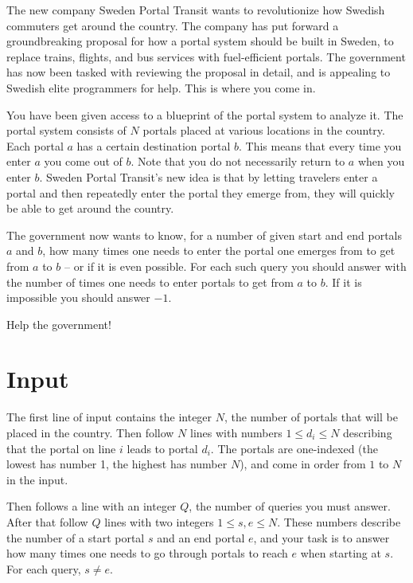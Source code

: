 
The new company Sweden Portal Transit wants to revolutionize how Swedish
commuters get around the country. The company has put forward
a groundbreaking proposal for how a portal system should be built in Sweden, to
replace trains, flights, and bus services with fuel-efficient portals. The government
has now been tasked with reviewing the proposal in detail, and is appealing to
Swedish elite programmers for help. This is where you come in.

You have been given access to a blueprint of the portal system to analyze it.
The portal system consists of $N$ portals placed at various locations in the country. Each portal $a$
has a certain destination portal $b$. This means that every time you enter $a$ you come
out of $b$. Note that you do not necessarily return to $a$ when you enter $b$.
Sweden Portal Transit's new idea is that by letting travelers enter
a portal and then repeatedly enter the portal they emerge from, they will quickly
be able to get around the country.

The government now wants to know, for a number of given start and end portals $a$ and $b$,
how many times one needs to enter the portal one emerges from to get from $a$ to
$b$ -- or if it is even possible. For each such query you should answer with the number of
times one needs to enter portals to get from $a$ to $b$. If it is impossible
you should answer $-1$.

Help the government!

\section*{Input}

The first line of input contains the integer $N$, the number of portals that will be placed in the country.
Then follow $N$ lines with numbers $1 \le d_i \le N$ describing that the portal on line $i$ leads to portal $d_i$.
The portals are one-indexed (the lowest has number 1, the highest has number $N$), and come in order from $1$ to $N$ in the input.

Then follows a line with an integer $Q$, the number of queries you must answer. After that
follow $Q$ lines with two integers $1 \le s, e \le N$. These numbers describe the number of a start portal $s$ and an
end portal $e$, and your task is to answer how many times one needs to go through portals
to reach $e$ when starting at $s$. For each query, $s \neq e$.

